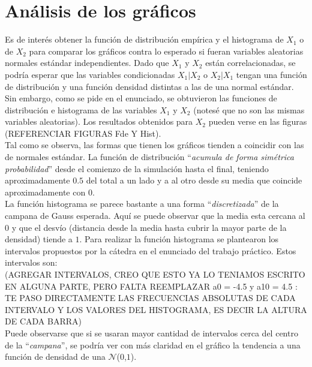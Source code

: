 \documentclass{article}
\begin{document}
\section{Análisis de los gráficos}

Es de interés obtener la función de distribución empírica y el histograma de $X_1$ o de $X_2$ para comparar los gráficos contra lo esperado si fueran variables aleatorias normales estándar independientes. Dado que $X_1$ y $X_2$ están correlacionadas, se podría esperar que las variables condicionadas $X_1|X_2$ o $X_2|X_1$ tengan una función de distribución y una función densidad distintas a las de una normal estándar. Sin embargo, como se pide en el enunciado, se obtuvieron las funciones de distribución e histograma de las variables $X_1$ y $X_2$ (notesé que no son las mismas variables aleatorias). Los resultados obtenidos para $X_2$ pueden verse en las figuras (REFERENCIAR FIGURAS Fde Y Hist).\\

Tal como se observa, las formas que tienen los gráficos tienden a coincidir con las de normales estándar. La función de distribución ``\emph{acumula de forma simétrica probabilidad}'' desde el comienzo de la simulación hasta el final, teniendo aproximadamente $0.5$ del total a un lado y a al otro desde su media que coincide aproximadamente con $0$.\\

La función histograma se parece bastante a una forma ``\emph{discretizada}'' de la campana de Gauss esperada. Aquí se puede observar que la media esta cercana al $0$ y que el desvío (distancia desde la media hasta cubrir la mayor parte de la densidad) tiende a $1$. Para realizar la función histograma se plantearon los intervalos propuestos por la cátedra en el enunciado del trabajo práctico. Estos intervalos son:\\

(AGREGAR INTERVALOS, CREO QUE ESTO YA LO TENIAMOS ESCRITO EN ALGUNA PARTE, PERO FALTA REEMPLAZAR a0 = -4.5 y a10 = 4.5 : TE PASO DIRECTAMENTE LAS FRECUENCIAS ABSOLUTAS DE CADA INTERVALO Y LOS VALORES DEL HISTOGRAMA, ES DECIR LA ALTURA DE CADA BARRA)\\

Puede observarse que si se usaran mayor cantidad de intervalos cerca del centro de la ``\emph{campana}'', se podría ver con más claridad en el gráfico la tendencia a una función de densidad de una $\mathcal{N}$($0$,$1$).
\end{document}
